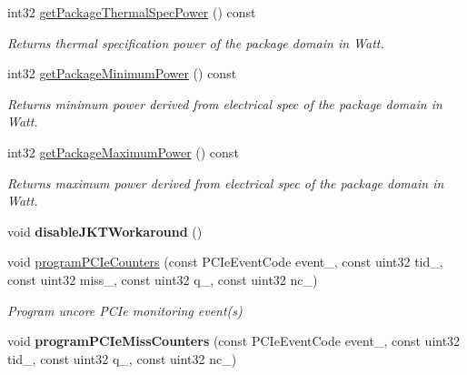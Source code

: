 \begin{DoxyCompactItemize}
\mbox{\label{class_p_c_m_a2dd024b683196cfbd6106252c47c3337}} 
int32 \mbox{\hyperlink{class_p_c_m_a2dd024b683196cfbd6106252c47c3337}{get\+Package\+Thermal\+Spec\+Power}} () const
\begin{DoxyCompactList}\small\item\em Returns thermal specification power of the package domain in Watt. \end{DoxyCompactList}\item 
\mbox{\label{class_p_c_m_ad3038bc44fb2fdd31e072b8cc8cf4b09}} 
int32 \mbox{\hyperlink{class_p_c_m_ad3038bc44fb2fdd31e072b8cc8cf4b09}{get\+Package\+Minimum\+Power}} () const
\begin{DoxyCompactList}\small\item\em Returns minimum power derived from electrical spec of the package domain in Watt. \end{DoxyCompactList}\item 
\mbox{\label{class_p_c_m_a51b39ec58f622cd07c07fdf03ae4f543}} 
int32 \mbox{\hyperlink{class_p_c_m_a51b39ec58f622cd07c07fdf03ae4f543}{get\+Package\+Maximum\+Power}} () const
\begin{DoxyCompactList}\small\item\em Returns maximum power derived from electrical spec of the package domain in Watt. \end{DoxyCompactList}\item 
\mbox{\label{class_p_c_m_abb695430e52dcf00adab2aa270f0cb11}} 
void {\bfseries disable\+J\+K\+T\+Workaround} ()
\item 
void \mbox{\hyperlink{class_p_c_m_af1b4ebd0ddc3ea32c04cb410f1eb48ad}{program\+P\+C\+Ie\+Counters}} (const P\+C\+Ie\+Event\+Code event\+\_\+, const uint32 tid\+\_, const uint32 miss\+\_, const uint32 q\+\_, const uint32 nc\+\_)
\begin{DoxyCompactList}\small\item\em Program uncore P\+C\+Ie monitoring event(s) \end{DoxyCompactList}\item 
\mbox{\label{class_p_c_m_a371855c0801aac4c04157524fa5a4666}} 
void {\bfseries program\+P\+C\+Ie\+Miss\+Counters} (const P\+C\+Ie\+Event\+Code event\+\_\+, const uint32 tid\+\_, const uint32 q\+\_, const uint32 nc\+\_)

\end{DoxyCompactItemize}
